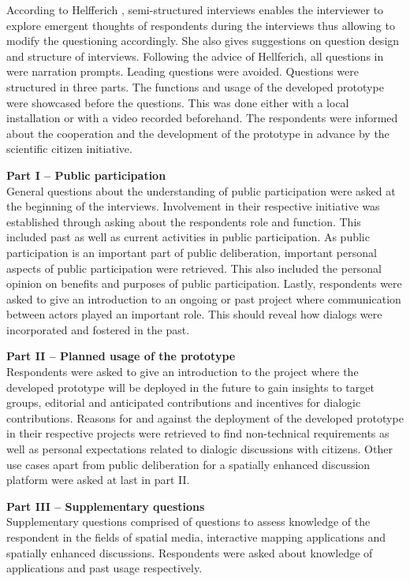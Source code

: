 According to Helfferich \cite{helfferich2005}, semi-structured interviews enables the interviewer to explore emergent thoughts of respondents during the interviews thus allowing to modify the questioning accordingly.  She also gives suggestions on question design and structure of interviews. Following the advice of Hellferich, all questions in were narration prompts. Leading questions were avoided. Questions were structured in three parts. The functions and usage of the developed prototype were showcased before the questions. This was done either with a local installation or with a video recorded beforehand. The respondents were informed about the cooperation and the development of the prototype in advance by the scientific citizen initiative.

\textbf{Part I -- Public participation}\\
General questions about the understanding of public participation were asked at the beginning of the interviews. Involvement in their respective initiative was established through asking about the respondents role and function. This included past as well as current activities in public participation. As public participation is an important part of public deliberation, important personal aspects of public participation were retrieved. This also included the personal opinion on benefits and purposes of public participation. Lastly, respondents were asked to give an introduction to an ongoing or past project where communication between actors played an important role. This should reveal how dialogs were incorporated and fostered in the past.

\textbf{Part II -- Planned usage of the prototype}\\
Respondents were asked to give an introduction to the project where the developed prototype will be deployed in the future to gain insights to target groups, editorial and anticipated contributions and incentives for dialogic contributions. Reasons for and against the deployment of the developed prototype in their respective projects were retrieved to find non-technical requirements as well as personal expectations related to dialogic discussions with citizens. Other use cases apart from public deliberation for a spatially enhanced discussion platform were asked at last in part II.

\textbf{Part III -- Supplementary questions}\\
Supplementary questions comprised of questions to assess knowledge of the respondent in the fields of spatial media, interactive mapping applications and spatially enhanced discussions. Respondents were asked about knowledge of applications and past usage respectively.

